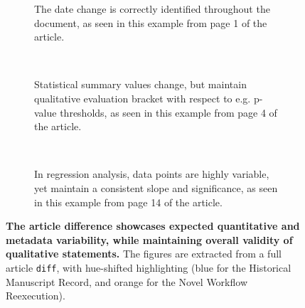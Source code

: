 \begin{figure}[H]
	\centering
	\begin{subfigure}{0.99\textwidth}
		\centering
		\caption{
			The date change is correctly identified throughout the document, as seen in this example from page 1 of the article.
		}
		\label{fig:diff_date}
	\end{subfigure}
	\\
	\begin{subfigure}{0.99\textwidth}
		\centering
		\caption{
			Statistical summary values change, but maintain qualitative evaluation bracket with respect to e.g. p-value thresholds, as seen in this example from page 4 of the article.
		}
		\label{fig:diff_text}
	\end{subfigure}
	\\
	\vspace{1em}
	\begin{subfigure}{0.99\textwidth}
		\centering
		\caption{
			In regression analysis, data points are highly variable, yet maintain a consistent slope and significance, as seen in this example from page 14 of the article.
		}
		\label{fig:diff_fig}
	\end{subfigure}
	\caption{
		\textbf{The article difference showcases expected quantitative and metadata variability, while maintaining overall validity of qualitative statements.}
		The figures are extracted from a full article \texttt{diff}, with hue-shifted highlighting (blue for the Historical Manuscript Record, and orange for the Novel Workflow Reexecution).
	}
	\label{fig:diff}
\end{figure}

